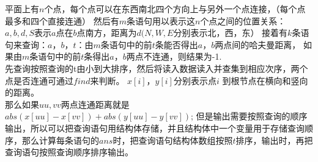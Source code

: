 平面上有$n$个点，每个点可以在东西南北四个方向上与另外一个点连接，（每个点最多和四个直接连通） 然后有$m$条语句用以表示这$n$个点之间的位置关系：$a,b,d,S$表示$a$点在$b$点南方，距离为$d(N,W,E$分别表示北，西，东） 接着有$k$条语句来查询：$a，b，t$：由$m$条语句中的前$t$条能否得出$a，b$两点间的哈夫曼距离， 如果由$m$条语句中的前$t$条得出$a，b$两点不连通，则结果为-1. \\

先查询按照查询的t由小到大排序，然后将读入数据读入并查集到相应次序，两个点是否连通可通过$find$来判断。 $x[i]，y[i]$分别表示点$i$ 到根节点在横向和竖向的距离。 \\
那么如果$uu,vv$两点连通距离就是$abs(x[uu]-x[vv])+abs(y[uu]-y[vv])$; 但是输出需要按照查询的顺序输出，所以可以把查询语句用结构体存储，并且结构体中一个变量用于存储查询顺序，那么计算每条语句的$ans$时，把查询语句结构体数组按照$t$排序，输出时，再把查询语句按照查询顺序排序输出。
